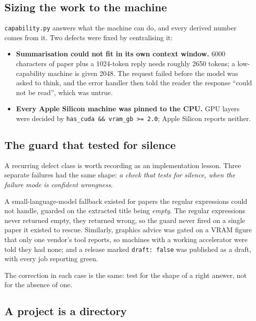 \documentclass[12pt,a4paper]{report}
\begin{document}
\subsection{Sizing the work to the machine}

\texttt{capability.py} answers what the machine can do, and every derived
number comes from it. Two defects were fixed by centralising it:

\begin{itemize}[leftmargin=*]
  \item \textbf{Summarisation could not fit in its own context window.} 6000
        characters of paper plus a 1024-token reply needs roughly 2650 tokens;
        a low-capability machine is given 2048. The request failed before the
        model was asked to think, and the error handler then told the reader the
        response ``could not be read'', which was untrue.
  \item \textbf{Every Apple Silicon machine was pinned to the CPU.} GPU layers
        were decided by \texttt{has\_cuda \&\& vram\_gb >= 2.0}; Apple Silicon
        reports neither.
\end{itemize}

\subsection{The guard that tested for silence}\label{sub:silence}

A recurring defect class is worth recording as an implementation lesson. Three
separate failures had the same shape: \emph{a check that tests for silence,
when the failure mode is confident wrongness}.

A small-language-model fallback existed for papers the regular expressions could
not handle, guarded on the extracted title being \emph{empty}. The regular
expressions never returned empty, they returned wrong, so the guard never
fired on a single paper it existed to rescue. Similarly, graphics advice was
gated on a VRAM figure that only one vendor's tool reports, so machines with a
working accelerator were told they had none; and a release marked
\texttt{draft: false} was published as a draft, with every job reporting green.

The correction in each case is the same: test for the shape of a right answer,
not for the absence of one.

\subsection{A project is a directory}
\end{document}
